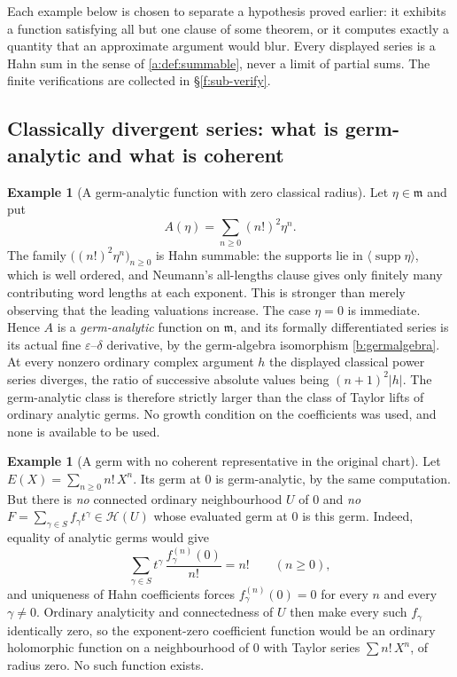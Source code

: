 \documentclass[11pt,a4paper]{article}
\numberwithin{equation}{section}
\theoremstyle{definition}
\newtheorem{example}[theorem]{Example}
\theoremstyle{remark}
\theoremstyle{plain}
\newcommand{\mm}{\mathfrak m}
\DeclareMathOperator{\supp}{supp}
\newcommand{\Hc}{\mathcal H}
\newcommand{\Neu}[1]{\langle #1\rangle}
\newcommand{\abs}[1]{\lvert #1\rvert}
\begin{document}
Each example below is chosen to separate a hypothesis proved earlier: it
exhibits a function satisfying all but one clause of some theorem, or it
computes exactly a quantity that an approximate argument would blur.
Every displayed series is a Hahn sum in the sense of
\ref{a:def:summable}, never a limit of partial sums.  The finite
verifications are collected in \S\ref{f:sub-verify}.

\subsection{Classically divergent series: what is germ-analytic and what
is coherent}\label{f:sub-divergent}

\begin{example}[A germ-analytic function with zero classical
radius]\label{f:ex-factorialsq}
Let $\eta\in\mm$ and put
\[
 A(\eta)=\sum_{n\ge0}(n!)^{2}\eta^{n}.
\]
The family $\bigl((n!)^{2}\eta^{n}\bigr)_{n\ge0}$ is Hahn summable: the
supports lie in $\Neu{\supp\eta}$, which is well ordered, and
Neumann's all-lengths clause gives only finitely many contributing
word lengths at each exponent. This is stronger than merely observing
that the leading valuations increase. The case $\eta=0$ is immediate.  Hence $A$ is a
\emph{germ-analytic} function on $\mm$, and its formally differentiated
series is its actual fine $\varepsilon$--$\delta$ derivative, by the
germ-algebra isomorphism \ref{b:germalgebra}.  At every nonzero
ordinary complex argument $h$ the displayed classical power series
diverges, the ratio of successive absolute values being
$(n+1)^{2}\abs h$.  The germ-analytic class is therefore strictly larger
than the class of Taylor lifts of ordinary analytic germs.  No growth
condition on the coefficients was used, and none is available to be
used.
\end{example}

\begin{example}[A germ with no coherent representative in the original
chart]\label{f:ex-euler}
Let $E(X)=\sum_{n\ge0}n!\,X^{n}$.  Its germ at $0$ is germ-analytic, by
the same computation.  But there is \emph{no} connected ordinary
neighbourhood $U$ of $0$ and \emph{no} $F=\sum_{\gamma\in S}f_{\gamma}
t^{\gamma}\in\Hc(U)$ whose evaluated germ at $0$ is this germ.  Indeed,
equality of analytic germs would give
\[
 \sum_{\gamma\in S}t^{\gamma}\,\frac{f_{\gamma}^{(n)}(0)}{n!}=n!
 \qquad(n\ge0),
\]
and uniqueness of Hahn coefficients forces
$f_{\gamma}^{(n)}(0)=0$ for every $n$ and every $\gamma\ne0$.  Ordinary
analyticity and connectedness of $U$ then make every such $f_{\gamma}$
identically zero, so the exponent-zero coefficient function would be an
ordinary holomorphic function on a neighbourhood of $0$ with Taylor
series $\sum n!\,X^{n}$, of radius zero.  No such function exists.
\end{example}
\end{document}
